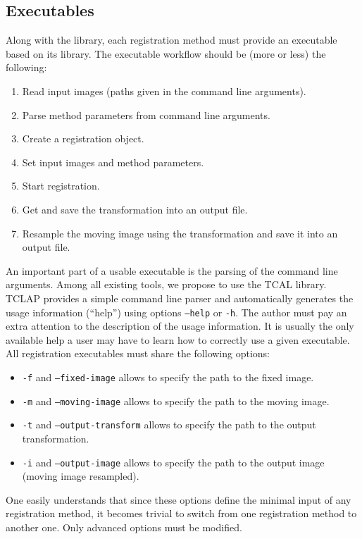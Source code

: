 \subsection{Executables}

Along with the library, each registration method must provide an executable based on its library. The executable workflow should be (more or less) the following:
%
\begin{enumerate}
\item Read input images (paths given in the command line arguments).
\item Parse method parameters from command line arguments.
\item Create a registration object.
\item Set input images and method parameters.
\item Start registration.
\item Get and save the transformation into an output file.
\item Resample the moving image using the transformation and save it into an output file.
\end{enumerate}
%
An important part of a usable executable is the parsing of the command line arguments. Among all existing tools, we propose to use the TCAL library. TCLAP provides a simple command line parser and automatically generates the usage information (``help'') using options \texttt{--help} or \texttt{-h}. The author must pay an extra attention to the description of the usage information. It is usually the only available help a user may have to learn how to correctly use a given executable.
\\

All registration executables must share the following options:
%
\begin{itemize}
\item \texttt{-f} and \texttt{--fixed-image} allows to specify the path to the fixed image.
\item \texttt{-m} and \texttt{--moving-image} allows to specify the path to the moving image.
\item \texttt{-t} and \texttt{--output-transform} allows to specify the path to the output transformation.
\item \texttt{-i} and \texttt{--output-image} allows to specify the path to the output image (moving image resampled).
\end{itemize}
%
One easily understands that since these options define the minimal input of any registration method, it becomes trivial to switch from one registration method to another one. Only advanced options must be modified.
\\

